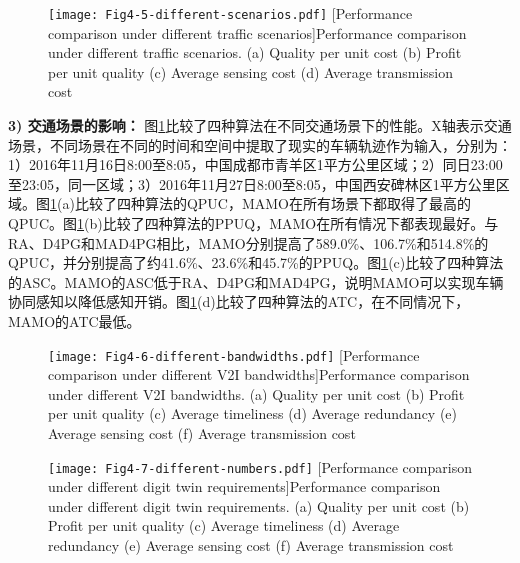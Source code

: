 \begin{figure}[h]
 \centering
 \texttt{[image: Fig4-5-different-scenarios.pdf]}
 [Performance comparison under different traffic scenarios]{Performance comparison under different traffic scenarios. (a) Quality per unit cost (b) Profit per unit quality (c) Average sensing cost (d) Average transmission cost}
 \label{fig 4-5}
\end{figure}

\textbf{3) 交通场景的影响：}
图\ref{fig 4-5}比较了四种算法在不同交通场景下的性能。X轴表示交通场景，不同场景在不同的时间和空间中提取了现实的车辆轨迹作为输入，分别为：1）2016年11月16日8:00至8:05，中国成都市青羊区1平方公里区域；2）同日23:00至23:05，同一区域；3）2016年11月27日8:00至8:05，中国西安碑林区1平方公里区域。图\ref{fig 4-5}(a)比较了四种算法的QPUC，MAMO在所有场景下都取得了最高的QPUC。图\ref{fig 4-5}(b)比较了四种算法的PPUQ，MAMO在所有情况下都表现最好。与RA、D4PG和MAD4PG相比，MAMO分别提高了589.0\%、106.7\%和514.8\%的QPUC，并分别提高了约41.6\%、23.6\%和45.7\%的PPUQ。图\ref{fig 4-5}(c)比较了四种算法的ASC。MAMO的ASC低于RA、D4PG和MAD4PG，说明MAMO可以实现车辆协同感知以降低感知开销。图\ref{fig 4-5}(d)比较了四种算法的ATC，在不同情况下，MAMO的ATC最低。

\begin{figure}[h]
 \centering
 \texttt{[image: Fig4-6-different-bandwidths.pdf]}
 [Performance comparison under different V2I bandwidths]{Performance comparison under different V2I bandwidths. (a) Quality per unit cost (b) Profit per unit quality (c) Average timeliness (d) Average redundancy (e) Average sensing cost (f) Average transmission cost}
 \label{fig 4-6}
\end{figure}

\begin{figure}[h]
 \centering
 \texttt{[image: Fig4-7-different-numbers.pdf]}
 [Performance comparison under different digit twin requirements]{Performance comparison under different digit twin requirements. (a) Quality per unit cost (b) Profit per unit quality (c) Average timeliness (d) Average redundancy (e) Average sensing cost (f) Average transmission cost}
 \label{fig 4-7}
\end{figure}

